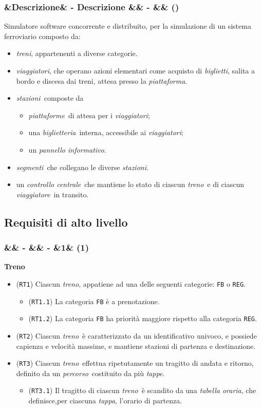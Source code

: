 \documentclass[slidestop,compress,blackandwhite]{beamer}
\newcommand{\ttt}[1]{\texttt{#1}}
\newcommand{\ii}[1]{\textit{#1}}
\newcommand{\treno}{\ii{treno}}
\newcommand{\treni}{\ii{treni}}
\newcommand{\viaggiatore}{\ii{viaggiatore}}
\newcommand{\viaggiatori}{\ii{viaggiatori}}
\newcommand{\stazioni}{\ii{stazioni}}
\newcommand{\piattaforma}{\ii{piattaforma}}
\newcommand{\piattaforme}{\ii{piattaforme}}
\newcommand{\tickets}{\ii{biglietti}}
\newcommand{\segmenti}{\ii{segmenti}}
\newcommand{\route}{\ii{percorso}}
\newcommand{\stage}{\ii{tappa}}
\newcommand{\stages}{\ii{tappe}}
\newcommand{\biglietteria}{\ii{biglietteria}}
\newcommand{\timetable}{\ii{tabella oraria}}
\newcommand{\controller}{\ii{controllo centrale}}
\newcommand{\newtitle}[4]{
	#1 
	\ifx&#2&%
	\else
  		\large- #2
	\fi
	\ifx&#3&%
	\else
  		\normalsize- #3
	\fi
	\ifx&#4&%
	\else
  		\normalsize (#4)
	\fi
}
\newcommand{\newframe}[5]{
	\begin{frame}
		\frametitle{\newtitle{#1}{#2}{#3}{#4}}
		#5
	\end{frame}
}
\newcommand{\itemt}[1]{\item (\ttt{#1})}
\begin{document}
	\newframe{}{Descrizione}{}{}{
		Simulatore software concorrente e distribuito, per la simulazione di un sistema ferroviario composto da:
		\begin{itemize}
			\item \treni, appartenenti a diverse categorie.
			\item \viaggiatori, che operano azioni elementari come acquisto di \tickets, salita a bordo e discesa dai treni, attesa presso la \piattaforma.
			\item \stazioni~composte da 
				\begin{itemize}
					\item \piattaforme~di attesa per i \viaggiatori;
					\item una \biglietteria~interna, accessibile ai \viaggiatori;
					\item un \ii{pannello informativo}.
				\end{itemize}
			\item \segmenti~che collegano le diverse \stazioni.
			\item un \controller~che mantiene lo stato di ciascun \treno~e di ciascun \viaggiatore~in transito.
		\end{itemize}
	}
	
	\subsection{Requisiti di alto livello}\label{requirements}
	
	\newframe{}{}{}{1}{
		\textbf{Treno}
		\begin{itemize}
			\itemt{RT1} Ciascun \treno, appatiene ad una delle seguenti categorie: \ttt{FB} o \ttt{REG}.
				\begin{itemize}
					\itemt{RT1.1} La categoria \ttt{FB} è a prenotazione. 
					\itemt{RT1.2} La categoria \ttt{FB} ha priorità maggiore rispetto alla categoria \ttt{REG}. 
				\end{itemize}
			\itemt{RT2} Ciascun \treno~è caratterizzato da un identificativo univoco, e possiede capienza e velocità massime, e mantiene stazioni di partenza e destinazione.
			\itemt{RT3} Ciascun \treno~effettua ripetutamente un tragitto di andata e ritorno, definito da un \route~costituito da più \stages.
				\begin{itemize}
					\itemt{RT3.1} Il tragitto di ciascun \treno~è scandito da una \timetable, che definisce,per ciascuna \stage, l'orario di partenza.
				\end{itemize}
		\end{itemize}
	}
	
\end{document}
